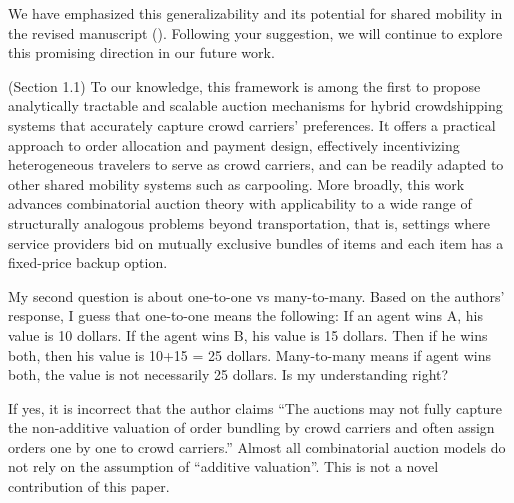 \begin{revresponse}[1.1.2]
\begin{itemize}
    \end{itemize}
    We have emphasized this generalizability and its potential for shared mobility in the revised manuscript (). Following your suggestion, we will continue to explore this promising direction in our future work. 
    \begin{changes}
        (Section 1.1) To our knowledge, this framework is among the first to propose analytically tractable and scalable auction mechanisms for hybrid crowdshipping systems that accurately capture crowd carriers' preferences. It offers a practical approach to order allocation and payment design, effectively incentivizing heterogeneous travelers to serve as crowd carriers, and can be readily adapted to other shared mobility systems such as carpooling. More broadly, this work advances combinatorial auction theory with applicability to a wide range of structurally analogous problems beyond transportation, that is, settings where service providers bid on mutually exclusive bundles of items and each item has a fixed-price backup option. 
    \end{changes}  
\end{revresponse}


\begin{revcomment}[1.2]
	My second question is about one-to-one vs many-to-many. Based on the authors' response, I guess that one-to-one means the following: If an agent wins A, his value is 10 dollars. If the agent wins B, his value is 15 dollars. Then if he wins both, then his value is 10+15 = 25 dollars. Many-to-many means if agent wins both, the value is not necessarily 25 dollars. Is my understanding right? 
    
    \quad If yes, it is incorrect that the author claims ``The auctions may not fully capture the non-additive valuation of order bundling by crowd carriers and often assign orders one by one to crowd carriers.'' Almost all combinatorial auction models do not rely on the assumption of ``additive valuation''. This is not a novel contribution of this paper. 
\end{revcomment}

